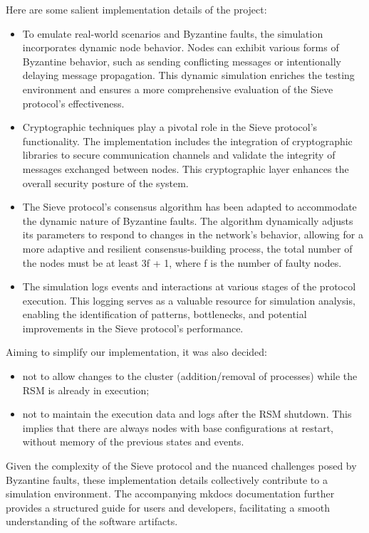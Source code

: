 \documentclass{scrartcl}
\begin{document}
Here are some salient implementation details of the project:

\begin{itemize}
    \item To emulate real-world scenarios and Byzantine faults, the simulation incorporates dynamic node behavior. Nodes can exhibit various forms of Byzantine behavior, such as sending conflicting messages or intentionally delaying message propagation. This dynamic simulation enriches the testing environment and ensures a more comprehensive evaluation of the Sieve protocol's effectiveness.
    \item Cryptographic techniques play a pivotal role in the Sieve protocol's functionality. The implementation includes the integration of cryptographic libraries to secure communication channels and validate the integrity of messages exchanged between nodes. This cryptographic layer enhances the overall security posture of the system.
    \item The Sieve protocol's consensus algorithm has been adapted to accommodate the dynamic nature of Byzantine faults. The algorithm dynamically adjusts its parameters to respond to changes in the network's behavior, allowing for a more adaptive and resilient consensus-building process, the total number of the nodes must be at least 3f + 1, where f is the number of faulty nodes.
    \item The simulation logs events and interactions at various stages of the protocol execution. This logging serves as a valuable resource for simulation analysis, enabling the identification of patterns, bottlenecks, and potential improvements in the Sieve protocol's performance.
\end{itemize}

Aiming to simplify our implementation, it was also decided:

\begin{itemize}
    \item not to allow changes to the cluster (addition/removal of processes) while the RSM is already in execution;
    \item not to maintain the execution data and logs after the RSM shutdown. This implies that there are always nodes with base configurations at restart, without memory of the previous states and events.
\end{itemize}

Given the complexity of the Sieve protocol and the nuanced challenges posed by Byzantine faults, these implementation details collectively contribute to a simulation environment. The accompanying mkdocs documentation further provides a structured guide for users and developers, facilitating a smooth understanding of the software artifacts.
\end{document}
